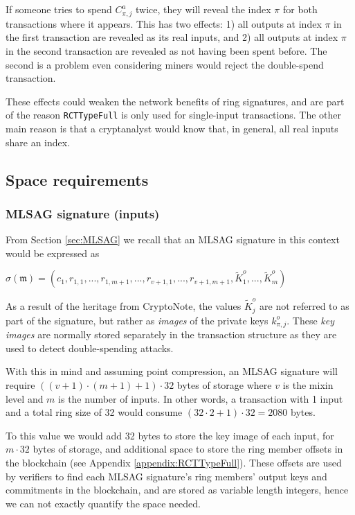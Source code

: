 If someone tries to spend $C^a_{\pi,j}$ twice, they will reveal the index $\pi$ for both transactions where it appears. This has two effects: 1) all outputs at index $\pi$ in the first transaction are revealed as its real inputs, and 2) all outputs at index $\pi$ in the second transaction are revealed as not having been spent before. The second is a problem even considering miners would reject the double-spend transaction.

These effects could weaken the network benefits of ring signatures, and are part of the reason {\tt RCTTypeFull} is only used for single-input transactions. The other main reason is that a cryptanalyst would know that, in general, all real inputs share an index.


\subsection{Space requirements}

\subsubsection*{MLSAG signature (inputs)}

From Section \ref{sec:MLSAG} we recall that an MLSAG signature in this context would be expressed as

\hfill \(\sigma(\mathfrak{m}) = (c_1, r_{1, 1}, ..., r_{1, m+1}, ..., r_{v+1, 1}, ..., r_{v+1, m+1}, \tilde{K}^o_1, ..., \tilde{K}^o_m) \) \hfill \phantom{.}

As a result of the heritage from CryptoNote, the values \(\tilde{K}^o_j\) are not referred to as part of the signature, but rather as {\em images} of the private keys $k^o_{\pi,j}$. These {\em key images} are normally stored separately in the transaction structure as they are used to detect double-spending attacks.

With this in mind and assuming point compression, an MLSAG signature will require $((v + 1) \cdot (m + 1) + 1) \cdot 32$ bytes of storage where $v$ is the mixin level and $m$ is the number of inputs. In other words, a transaction with 1 input and a total ring size of 32 would consume $(32 \cdot 2 + 1) \cdot 32 = 2080$ bytes.

To this value we would add 32 bytes to store the key image of each input, for $m \cdot 32$ bytes of storage, and additional space to store the ring member offsets in the blockchain (see Appendix \ref{appendix:RCTTypeFull}). These offsets are used by verifiers to find each MLSAG signature's ring members' output keys and commitments in the blockchain, and are stored as variable length integers, hence we can not exactly quantify the space needed.


